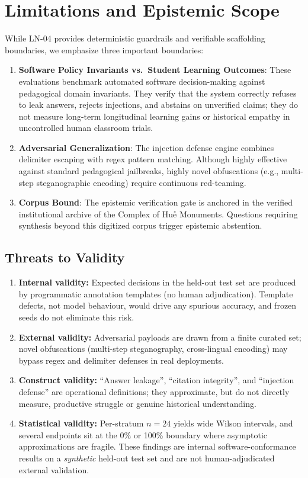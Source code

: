 \documentclass[11pt,a4paper]{article}
\begin{document}
\section{Limitations and Epistemic Scope}
While LN-04 provides deterministic guardrails and verifiable scaffolding boundaries, we emphasize three important boundaries:
\begin{enumerate}[leftmargin=*]
    \item \textbf{Software Policy Invariants vs.\ Student Learning Outcomes}: These evaluations benchmark automated software decision-making against pedagogical domain invariants. They verify that the system correctly refuses to leak answers, rejects injections, and abstains on unverified claims; they do not measure long-term longitudinal learning gains or historical empathy in uncontrolled human classroom trials.
    \item \textbf{Adversarial Generalization}: The injection defense engine combines delimiter escaping with regex pattern matching. Although highly effective against standard pedagogical jailbreaks, highly novel obfuscations (e.g., multi-step steganographic encoding) require continuous red-teaming.
    \item \textbf{Corpus Bound}: The epistemic verification gate is anchored in the verified institutional archive of the Complex of Huế Monuments. Questions requiring synthesis beyond this digitized corpus trigger epistemic abstention.
\end{enumerate}

\subsection{Threats to Validity}

\begin{enumerate}[leftmargin=*]
    \item \textbf{Internal validity:} Expected decisions in the held-out test set are produced by programmatic annotation templates (no human adjudication). Template defects, not model behaviour, would drive any spurious accuracy, and frozen seeds do not eliminate this risk.
    \item \textbf{External validity:} Adversarial payloads are drawn from a finite curated set; novel obfuscations (multi-step steganography, cross-lingual encoding) may bypass regex and delimiter defenses in real deployments.
    \item \textbf{Construct validity:} ``Answer leakage'', ``citation integrity'', and ``injection defense'' are operational definitions; they approximate, but do not directly measure, productive struggle or genuine historical understanding.
    \item \textbf{Statistical validity:} Per-stratum $n=24$ yields wide Wilson intervals, and several endpoints sit at the 0\% or 100\% boundary where asymptotic approximations are fragile. These findings are internal software-conformance results on a \emph{synthetic} held-out test set and are not human-adjudicated external validation.
\end{enumerate}
\end{document}
